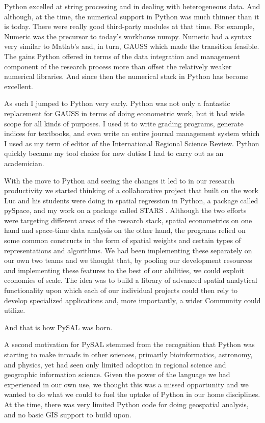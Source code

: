 \documentclass[11pt]{article}
\begin{document}
Python excelled at string processing and in dealing with heterogeneous data.
And although, at the time, the numerical support in Python was much thinner
than it is today. There were really good third-party modules at that time. For
example, Numeric was the precursor to today's workhorse numpy. Numeric had a
syntax very similar to Matlab's and, in turn, GAUSS which made the transition
feasible. The gains Python offered in terms of the data integration and management
component of the research process more than offset the relatively weaker
numerical libraries. And since then the numerical stack in Python has become
excellent.

As such I jumped to Python very early. Python was not only a fantastic
replacement for GAUSS in terms of doing econometric work, but it had wide scope
for all kinds of purposes. I used it to write grading programs, generate
indices for textbooks, and even write an entire journal management system which
I used as my term of editor of the International Regional Science Review.
Python quickly became my tool choice for new duties I had to carry out as an
academician. 

With the move to Python and seeing the changes it led to in our research
productivity we started thinking of a collaborative project that built on the
work Luc and his students were doing in spatial regression in Python, a package
called pySpace, and my work on a package called STARS \citep{rey_stars:_2006-3}.
Although the two efforts were targeting different areas of the research stack,
spatial econometrics on one hand and space-time data analysis on the other
hand, the programs relied on some common constructs in the form of spatial
weights and certain types of representations and algorithms. We had been
implementing these separately on our own two teams and we thought that, by
pooling our development resources and implementing these features to the best
of our abilities, we could exploit economies of scale. The idea was to build a
library of advanced spatial analytical functionality upon which each of our
individual projects could then rely to develop specialized applications and,
more importantly, a wider Community could utilize.


And that is how PySAL was born.

A second motivation for PySAL stemmed from the recognition that Python was
starting to make inroads in other sciences, primarily bioinformatics,
astronomy, and physics, yet had seen only limited adoption in regional science
and geographic information science. Given the power of the language we had
experienced in our own use, we thought this was a missed opportunity and we
wanted to do what we could to fuel the uptake of Python in our home
disciplines. At the time, there was very limited Python code for doing
geospatial analysis, and no basic GIS support to build upon.
\end{document}
